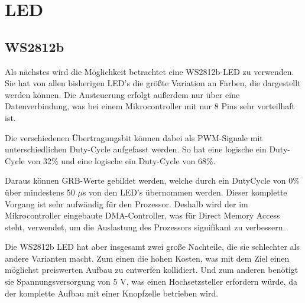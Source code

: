 \documentclass[a4paper,
DIV=13,
12pt,
BCOR=10mm,
department=FakEI,
parskip=half,
automark,
]{article}
\begin{document}
\newpage
\section{LED}
\subsection{WS2812b}

Als nächstes wird die Möglichkeit betrachtet eine WS2812b-LED zu verwenden. Sie hat von allen bisherigen LED's die größte Variation an Farben, die dargestellt werden können. Die Ansteuerung erfolgt außerdem nur über eine Datenverbindung, was bei einem Mikrocontroller mit nur 8 Pins sehr vorteilhaft ist.

Die verschiedenen Übertragungsbit können dabei als PWM-Signale mit unterschiedlichen Duty-Cycle aufgefasst werden. So hat eine logische \grqq{} ein Duty-Cycle von 32\% und eine logische \grqq{} ein Duty-Cycle von 68\%. 

Daraus können GRB-Werte gebildet werden, welche durch ein Duty\-Cycle von 0\% über mindestens 50 $\mu$s von den LED's übernommen werden. Dieser komplette Vorgang ist sehr aufwändig für den Prozessor. Deshalb wird der im Mikrocontroller eingebaute DMA-Controller, was für \glqq Direct Memory Access\grqq{} steht, verwendet, um die Auslastung des Prozessors signifikant zu verbessern. 

Die WS2812b LED hat aber insgesamt zwei große Nachteile, die sie schlechter als andere Varianten macht. Zum einen die hohen Kosten, was mit dem Ziel einen möglichst preiswerten Aufbau zu entwerfen kollidiert. Und zum anderen benötigt sie Spannungsversorgung von 5 V, was einen Hochsetzsteller erfordern würde, da der komplette Aufbau mit einer Knopfzelle betrieben wird.

\newpage
\end{document}
